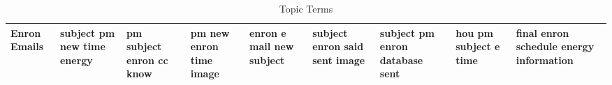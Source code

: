 \documentclass[11pt,a4paper]{article}
\begin{document}
\begin{appendices}
\begin{table}[htp]
\begin{tiny}
\begin{tabular}{|p{}|p{}|p{}|p{}|p{}|p{}|p{}|p{}|p{}|}
Enron Emails & subject \newline pm \newline new \newline time \newline energy & pm \newline subject \newline enron \newline cc \newline know & pm \newline new \newline enron \newline time \newline image & enron \newline e \newline mail \newline new \newline subject & subject \newline enron \newline said \newline sent \newline image & subject \newline pm \newline enron \newline database \newline sent & hou \newline pm \newline subject \newline e \newline time & final \newline enron \newline schedule \newline energy \newline information\\\hline
\end{tabular}
\end{tiny}
\caption{Topic Terms}
\end{table}


\end{appendices}
\end{document}
